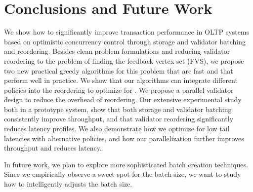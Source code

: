 \section{Conclusions and Future Work}\label{sec:conclusion}

We show how to significantly improve transaction performance in OLTP systems based on optimistic concurrency control through storage and validator batching and reordering. Besides clean problem formulations and
reducing validator reordering to the problem of finding the  feedback vertex set (FVS), we propose two new practical greedy algorithms for this problem
that are fast and that perform well in practice. We show that our algorithms can integrate different policies into the reordering to optimize for . We  propose a parallel validator design to reduce the overhead of reordering. Our extensive experimental study both in a prototype system,  show that both storage and validator batching consistently improve throughput, and that validator reordering 
significantly reduces latency profiles. We also demonstrate how we optimize for low tail latencies with alternative policies, and how our parallelization further improves
throughput and reduces latency.

In future work, we plan to explore more sophisticated batch creation techniques. Since we empirically observe a sweet spot for the  batch size, we want to study how to intelligently adjusts the batch size. 
